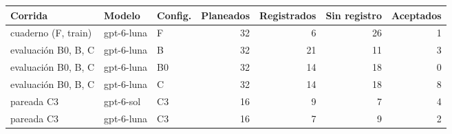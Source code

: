 \begin{tabular}{@{}lllrrrr@{}}
\toprule
Corrida & Modelo & Config. & Planeados & Registrados & Sin registro & Aceptados\\
\midrule
cuaderno (F, train) & gpt-6-luna & F & 32 & 6 & 26 & 1\\
evaluación B0, B, C & gpt-6-luna & B & 32 & 21 & 11 & 3\\
evaluación B0, B, C & gpt-6-luna & B0 & 32 & 14 & 18 & 0\\
evaluación B0, B, C & gpt-6-luna & C & 32 & 14 & 18 & 8\\
pareada C3 & gpt-6-sol & C3 & 16 & 9 & 7 & 4\\
pareada C3 & gpt-6-luna & C3 & 16 & 7 & 9 & 2\\
\bottomrule
\end{tabular}
